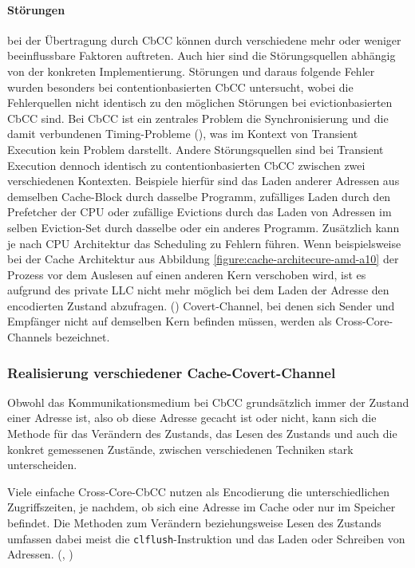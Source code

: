 \paragraph{Störungen\label{section:cbcc-disturbance}} bei der
Übertragung durch \ac{CbCC} können
durch verschiedene mehr oder weniger beeinflussbare Faktoren
auftreten. Auch hier sind die Störungsquellen abhängig von der
konkreten Implementierung. Störungen und daraus folgende Fehler
wurden besonders bei contentionbasierten \ac{CbCC} untersucht,
wobei die Fehlerquellen nicht identisch zu den möglichen
Störungen bei evictionbasierten \ac{CbCC} sind. Bei \ac{CbCC}
ist ein zentrales Problem die Synchronisierung
und die damit verbundenen Timing-Probleme
(\cite[6,8]{maurice_hello_2017}),
was im Kontext von Transient Execution kein Problem darstellt.
Andere Störungsquellen sind bei Transient Execution dennoch
identisch zu contentionbasierten \ac{CbCC} zwischen zwei
verschiedenen Kontexten. Beispiele hierfür sind
das Laden anderer Adressen aus demselben Cache-Block durch
dasselbe Programm, zufälliges Laden durch den Prefetcher
der \ac{CPU} oder zufällige Evictions durch das Laden von
Adressen im selben Eviction-Set durch dasselbe oder ein anderes
Programm. Zusätzlich kann je nach \ac{CPU} Architektur das
Scheduling zu Fehlern führen. Wenn beispielsweise bei der Cache
Architektur aus Abbildung \ref{figure:cache-architecure-amd-a10}
der Prozess vor dem Auslesen auf einen anderen Kern verschoben
wird, ist es aufgrund des private \ac{LLC} nicht mehr möglich bei
dem Laden der Adresse den encodierten Zustand abzufragen.
(\cite[4]{wu_whispers_2012})
Covert-Channel, bei denen sich Sender und Empfänger nicht auf
demselben Kern befinden müssen, werden als Cross-Core-Channels
bezeichnet.

\subsubsection{Realisierung verschiedener Cache-Covert-Channel}
Obwohl das Kommunikationsmedium bei \ac{CbCC} grundsätzlich immer
der Zustand einer Adresse ist, also ob diese Adresse gecacht ist
oder nicht, kann sich die Methode für das Verändern des Zustands, das
Lesen des Zustands und auch die konkret gemessenen Zustände,
zwischen verschiedenen Techniken stark unterscheiden.

Viele einfache Cross-Core-\ac{CbCC} nutzen als Encodierung die
unterschiedlichen Zugriffszeiten, je nachdem, ob sich eine Adresse
im Cache oder nur im Speicher befindet. Die Methoden
zum Verändern beziehungsweise Lesen des Zustands umfassen dabei
meist die \verb|clflush|-Instruktion und das Laden
oder Schreiben von Adressen. (\cite[722]{yarom_flushreload_2014},
\cite[6]{almgren_c5_2015})

